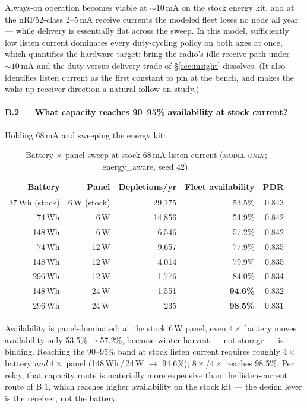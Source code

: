 \documentclass[11pt]{article}
\newcommand{\modelonly}{\textsc{model-only}}
\begin{document}
Always-on operation becomes viable at ${\sim}10$\,mA on the stock energy kit,
and at the nRF52-class 2--5\,mA receive currents the modeled fleet loses no
node all year --- while delivery is essentially flat across the sweep. In this
model, sufficiently low listen current dominates every duty-cycling policy on
both axes at once, which quantifies the hardware target: bring the radio's
idle receive path under ${\sim}10$\,mA and the duty-versus-delivery trade of
\S\ref{sec:insight} dissolves. (It also identifies listen current as the
first constant to pin at the bench, and makes the wake-up-receiver direction
a natural follow-on study.)

\paragraph{B.2 --- What capacity reaches 90--95\% availability at stock current?}
Holding 68\,mA and sweeping the energy kit:

\begin{table}[h]
\centering\small
\begin{tabular}{@{}rrrrr@{}}
\toprule
Battery & Panel & Depletions/yr & Fleet availability & PDR \\
\midrule
37\,Wh (stock) & 6\,W (stock) & 29{,}175 & 53.5\% & 0.843 \\
74\,Wh & 6\,W & 14{,}856 & 54.9\% & 0.842 \\
148\,Wh & 6\,W & 6{,}546 & 57.2\% & 0.842 \\
74\,Wh & 12\,W & 9{,}657 & 77.9\% & 0.835 \\
148\,Wh & 12\,W & 4{,}014 & 79.9\% & 0.835 \\
296\,Wh & 12\,W & 1{,}776 & 84.0\% & 0.834 \\
148\,Wh & 24\,W & 1{,}551 & \textbf{94.6\%} & 0.832 \\
296\,Wh & 24\,W & 235 & \textbf{98.5\%} & 0.831 \\
\bottomrule
\end{tabular}
\caption{Battery $\times$ panel sweep at stock 68\,mA listen current
(\modelonly; energy\_aware, seed 42).}
\end{table}

Availability is panel-dominated: at the stock 6\,W panel, even $4\times$
battery moves availability only 53.5\%$\to$57.2\%, because winter harvest ---
not storage --- is binding. Reaching the 90--95\% band at stock listen
current requires roughly $4\times$ battery \emph{and} $4\times$ panel
(148\,Wh\,/\,24\,W $\to$ 94.6\%); $8\times$/$4\times$ reaches 98.5\%. Per
relay, that capacity route is materially more expensive than the
listen-current route of B.1, which reaches higher availability on the stock
kit --- the design lever is the receiver, not the battery.
\end{document}
